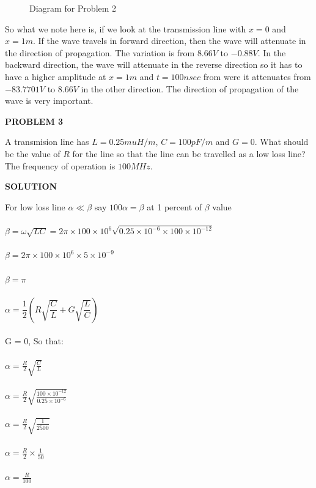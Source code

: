 \begin{exmp}
\begin{figure}[h!]
\caption{Diagram for Problem 2}
\end{figure}
So what we note here is, if we look at the transmission line with ${x=0}$ and ${x=1m}$. If the wave travels in forward direction, then the wave will attenuate in the direction of propagation. The variation is from ${8.66V}$ to ${-0.88V}$. In the backward direction, the wave will attenuate in the reverse direction so it has to  have a higher amplitude at ${x=1m}$ and ${t=100nsec}$ from were it attenuates from ${-83.7701V}$ to ${8.66V}$ in the other direction. The direction of propagation of the wave is very important.\\
\begin{center}
\textbf{PROBLEM 3}
\end{center}
A transmision line has $L = 0.25muH/m$, $C=100pF/m$ and ${G=0}$. What should be the value of ${R}$ for the line so that the line can be travelled as a low loss line? The frequency of operation is ${100MHz}$.\\
\begin{center}
\textbf{SOLUTION}
\end{center}
For low loss line ${\alpha\ll\beta}$ say ${100\alpha=\beta}$ at 1 percent of ${\beta}$ value\\\\
${\beta=\omega\sqrt{LC}} = {2\pi\times100\times10^6\sqrt{0.25\times10^{-6}\times100\times10^{-12}}}$\\\\
${\beta=2\pi\times100\times10^6\times5\times10^{-9}}$\\\\
${\beta=\pi}$\\\\			${\alpha={\dfrac{1}{2}}(R\sqrt{\dfrac{C}{L}}+G\sqrt{\dfrac{L}{C}})}$\\\\
G = 0, So that:\\\\
${\alpha={\frac{R}{2}}\sqrt{\frac{C}{L}}}$\\\\
${\alpha=\frac{R}{2}\sqrt{\frac{100\times10^{-12}}{0.25\times10^{-6}}}}$\\\\
${\alpha=\frac{R}{2}\sqrt{\frac{1}{2500}}}$\\\\
${\alpha=\frac{R}{2}\times\frac{1}{50}}$\\\\
${\alpha=\frac{R}{100}}$\\\\

\end{exmp}
